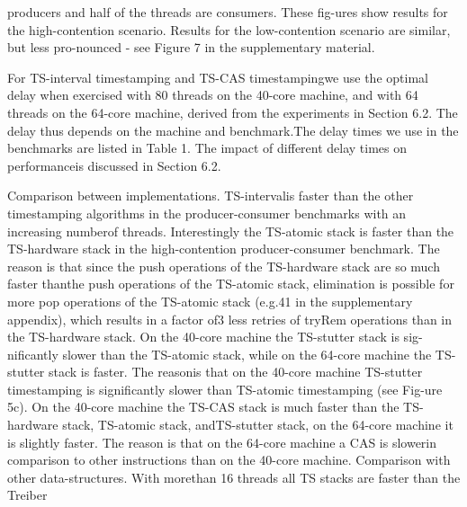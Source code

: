 producers and half of the threads are consumers. These fig-ures show results for the high-contention scenario. Results
for the low-contention scenario are similar, but less pro-nounced - see Figure 7 in the supplementary material.

For TS-interval timestamping and TS-CAS timestampingwe use the optimal delay when exercised with 80 threads
on the 40-core machine, and with 64 threads on the 64-core machine, derived from the experiments in Section 6.2.
The delay thus depends on the machine and benchmark.The delay times we use in the benchmarks are listed in
Table 1. The impact of different delay times on performanceis discussed in Section 6.2.

Comparison between implementations. TS-intervalis faster than the other timestamping algorithms in the
producer-consumer benchmarks with an increasing numberof threads. Interestingly the TS-atomic stack is faster than
the TS-hardware stack in the high-contention producer-consumer benchmark. The reason is that since the push operations of the TS-hardware stack are so much faster thanthe push operations of the TS-atomic stack, elimination is
possible for more pop operations of the TS-atomic stack (e.g.41%
in the supplementary appendix), which results in a factor of3 less retries of tryRem operations than in the TS-hardware
stack. On the 40-core machine the TS-stutter stack is sig-nificantly slower than the TS-atomic stack, while on the
64-core machine the TS-stutter stack is faster. The reasonis that on the 40-core machine TS-stutter timestamping is
significantly slower than TS-atomic timestamping (see Fig-ure 5c). On the 40-core machine the TS-CAS stack is much
faster than the TS-hardware stack, TS-atomic stack, andTS-stutter stack, on the 64-core machine it is slightly faster.
The reason is that on the 64-core machine a CAS is slowerin comparison to other instructions than on the 40-core
machine.
Comparison with other data-structures. With morethan 16 threads all TS stacks are faster than the Treiber

